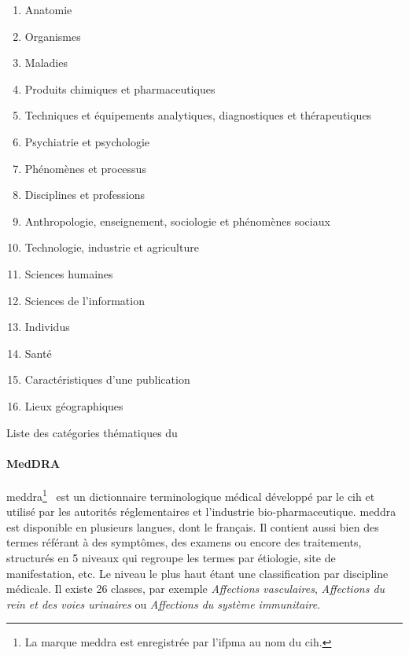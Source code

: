 \begin{table}[H]
    \begin{multicols}{2}
        \begin{enumerate}[label=\textbf{\Alph*}]
            \item \label{mesh:A} Anatomie
            \item \label{mesh:B} Organismes
            \item \label{mesh:C} Maladies
            \item \label{mesh:D} Produits chimiques et pharmaceutiques
            \item \label{mesh:E} Techniques et équipements analytiques, diagnostiques et thérapeutiques
            \item \label{mesh:F} Psychiatrie et psychologie
            \item \label{mesh:G} Phénomènes et processus
            \item \label{mesh:H} Disciplines et professions
            \item \label{mesh:I} Anthropologie, enseignement, sociologie et phénomènes sociaux
            \item \label{mesh:J} Technologie, industrie et agriculture
            \item \label{mesh:K} Sciences humaines
            \item \label{mesh:L} Sciences de l'information
            \item \label{mesh:M} Individus
            \item \label{mesh:N} Santé
                  \setcounter{enumi}{21}
            \item \label{mesh:V} Caractéristiques d'une publication
                  \setcounter{enumi}{25}
            \item \label{mesh:Z} Lieux géographiques
        \end{enumerate}
    \end{multicols}
    \caption{Liste des catégories thématiques du }
\end{table}

\paragraph{MedDRA}
\gls{meddra}\footnote{La marque \gls{meddra} est enregistrée par l'\acs{ifpma} au nom du \acs{cih}.}~\cite{brownMedicalDictionaryRegulatory1999} est un dictionnaire terminologique médical développé par le \gls{cih} et utilisé par les autorités réglementaires et l'industrie bio-pharmaceutique.
\gls{meddra} est disponible en plusieurs langues, dont le français.
Il contient aussi bien des termes référant à des symptômes, des examens ou encore des traitements, structurés en 5 niveaux qui regroupe les termes par étiologie, site de manifestation, etc.
Le niveau le plus haut étant une classification par discipline médicale.
Il existe 26 classes, par exemple \textit{Affections vasculaires}, \textit{Affections du rein et des voies urinaires} ou \textit{Affections du système immunitaire}.


